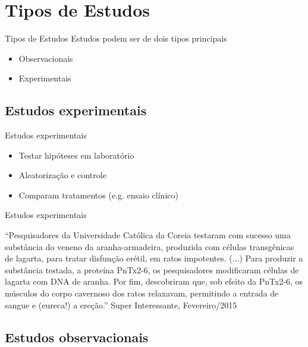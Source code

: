 \documentclass{beamer}
\begin{document}
\section{Tipos de Estudos}
\begin{frame}{Tipos de Estudos}
  Estudos podem ser de dois tipos principais
  \begin{itemize}
  \item Observacionais
  \item Experimentais
  \end{itemize}
\end{frame}

\subsection{Estudos experimentais}

\begin{frame}{Estudos experimentais}
  \begin{itemize}
  \item Testar hipóteses em laboratório
  \item Aleatorização e controle
  \item Comparam tratamentos (e.g. ensaio clínico)
  \end{itemize}
\end{frame}

\begin{frame}{Estudos experimentais}
  \begin{example}
    ``Pesquisadores da Universidade Católica da Coreia testaram com
    sucesso uma substância do veneno da aranha-armadeira, produzida
    com células transgênicas de lagarta, para tratar disfunção erétil,
    em \alert{ratos impotentes}. (...) Para produzir a substância
    testada, a proteína PnTx2-6, os pesquisadores modificaram células
    de lagarta com DNA de aranha. Por fim, descobriram que, sob efeito
    da PnTx2-6, os músculos do corpo cavernoso dos ratos relaxavam,
    permitindo a entrada de sangue e (eureca!) a ereção.'' Super
    Interessante, Fevereiro/2015
  \end{example}
  \end{frame}

\subsection{Estudos observacionais}
\end{document}

